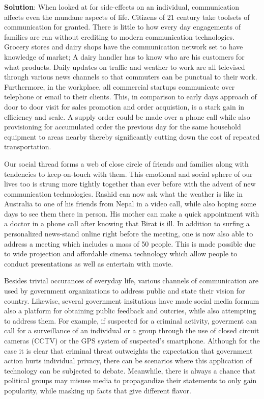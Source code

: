 \documentclass[
  openany]{book}
\newenvironment{solution}{ {\bfseries Solution}:}{}
\begin{document}
\begin{solution}
When looked at for side-effects on an individual, communication affects even the mundane aspects of life. Citizens of 21 century take toolsets of communication for granted. There is little to how every day engagements of families are ran without crediting to modern communication technologies. Grocery stores and dairy shops have the communication network set to have knowledge of market; A dairy handler has to know who are his customers for what products. Daily updates on traffic and weather to work are all televised through various news channels so that commuters can be punctual to their work. Furthermore, in the workplace, all commercial startups communicate over telephone or email to their clients. This, in comparison to early days approach of door to door visit for sales promotion and order acquistion, is a stark gain in efficiency and scale. A supply order could be made over a phone call while also provisioning for accumulated order the previous day for the same household equipment to areas nearby thereby significantly cutting down the cost of repeated transportation.

Our social thread forms a web of close circle of friends and families along with tendencies to keep-on-touch with them. This emotional and social sphere of our lives too is strung more tightly together than ever before with the advent of new communication technologies. Rashid can now ask what the weather is like in Australia to one of his friends from Nepal in a video call, while also hoping some days to see them there in person. His mother can make a quick appointment with a doctor in a phone call after knowing that Birat is ill. In addition to surfing a personalized news-stand online right before the meeting, one is now also able to address a meeting which includes a mass of 50 people. This is made possible due to wide projection and affordable cinema technology which allow people to conduct presentations as well as entertain with movie.

Besides trivial occurances of everyday life, various channels of communication are used by government organizations to address public and state their vision for country. Likewise, several government insitutions have made social media formum also a platform for obtaining public feedback and outcries, while also attempting to address them. For example, if suspected for a criminal activity, goverment can call for a surveillance of an individual or a group through the use of closed circuit cameras (CCTV) or the GPS system of suspected's smartphone. Although for the case it is clear that criminal threat outweights the expectation that government action hurts individual privacy, there can be scenarios where this application of technology can be subjected to debate. Meanwhile, there is always a chance that political groups may misuse media to propagandize their statements to only gain popularity, while masking up facts that give different flavor.


\end{solution}
\end{document}
